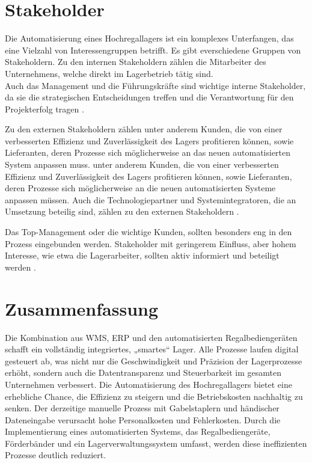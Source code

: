 \chapter{Stakeholder}
Die Automatisierung eines Hochregallagers ist ein komplexes Unterfangen, das eine Vielzahl von Interessengruppen betrifft. Es gibt everschiedene Gruppen von Stakeholdern. 
Zu den internen Stakeholdern zählen die Mitarbeiter des Unternehmens, welche direkt im Lagerbetrieb tätig sind. \\
Auch das Management und die Führungskräfte sind wichtige interne Stakeholder, da sie die strategischen Entscheidungen treffen und die Verantwortung für den Projekterfolg tragen \autocite{trusteddecisions_stakeholderanalyse_2024}.

Zu den externen Stakeholdern zählen unter anderem Kunden, die von einer verbesserten Effizienz und Zuverlässigkeit des Lagers profitieren können, sowie Lieferanten, deren Prozesse sich möglicherweise an das neuen automatisierten System anpassen muss.
unter anderem Kunden, die von einer verbesserten Effizienz und Zuverlässigkeit des Lagers profitieren können, sowie Lieferanten, deren Prozesse sich möglicherweise an die neuen automatisierten Systeme anpassen müssen. Auch die Technologiepartner und Systemintegratoren, die an Umsetzung beteilig sind, zählen zu den externen Stakeholdern \autocite{trusteddecisions_stakeholderanalyse_2024} \autocite{redaktion_stakeholder-management_2013}.

Das Top-Management oder die wichtige Kunden, sollten besonders eng in den Prozess eingebunden werden. Stakeholder mit geringerem Einfluss, aber hohem Interesse, wie etwa die Lagerarbeiter, sollten aktiv informiert und beteiligt werden \autocite{trusteddecisions_stakeholderanalyse_2024}.



\chapter{Zusammenfassung}

Die Kombination aus WMS, ERP und den automatisierten Regalbediengeräten schafft ein vollständig integriertes, „smartes“ Lager. Alle Prozesse laufen digital gesteuert ab, was nicht nur die Geschwindigkeit und Präzision der Lagerprozesse erhöht, sondern auch die Datentransparenz und Steuerbarkeit im gesamten Unternehmen verbessert.
Die Automatisierung des Hochregallagers bietet eine erhebliche Chance, die Effizienz zu steigern und die Betriebskosten nachhaltig zu senken. Der derzeitige manuelle Prozess mit Gabelstaplern und händischer Dateneingabe verursacht hohe Personalkosten und Fehlerkosten. Durch die Implementierung eines automatisierten Systems, das Regalbediengeräte, Förderbänder und ein Lagerverwaltungssystem umfasst, werden diese ineffizienten Prozesse deutlich reduziert.

